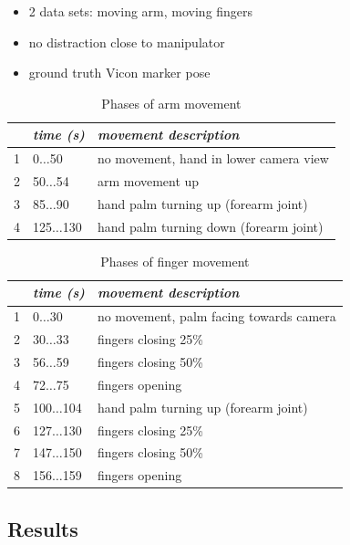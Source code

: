 \begin{itemize}
\item 2 data sets: moving arm, moving fingers
\item no distraction close to manipulator
\item ground truth Vicon marker pose
\end{itemize}

\begin{table}
\centering
\begin{tabular}{|c|l|l|}
\hline
 & \emph{time (s)} & \emph{movement description} \\
\hline
1 & 0$\dots$50 & no movement, hand in lower camera view \\
\hline
2 & 50$\dots$54 & arm movement up \\
\hline
3 & 85$\dots$90 & hand palm turning up (forearm joint) \\
\hline
4 & 125$\dots$130 & hand palm turning down (forearm joint) \\
\hline
\end{tabular}
\caption{Phases of arm movement}
\label{tab:vic_arm_movement_phases}
\end{table}

\begin{table}
\centering
\begin{tabular}{|c|l|l|}
\hline
 & \emph{time (s)} & \emph{movement description} \\
\hline
1 & 0$\dots$30 & no movement, palm facing towards camera \\
\hline
2 & 30$\dots$33 & fingers closing 25\% \\
\hline
3 & 56$\dots$59 & fingers closing 50\% \\
\hline
4 & 72$\dots$75 & fingers opening \\
\hline
5 & 100$\dots$104 & hand palm turning up (forearm joint) \\
\hline
6 & 127$\dots$130 & fingers closing 25\% \\
\hline
7 & 147$\dots$150 & fingers closing 50\% \\
\hline
8 & 156$\dots$159 & fingers opening \\
\hline
\end{tabular}
\caption{Phases of finger movement}
\label{tab:vic_finger_movement_phases}
\end{table}


\subsection{Results}

